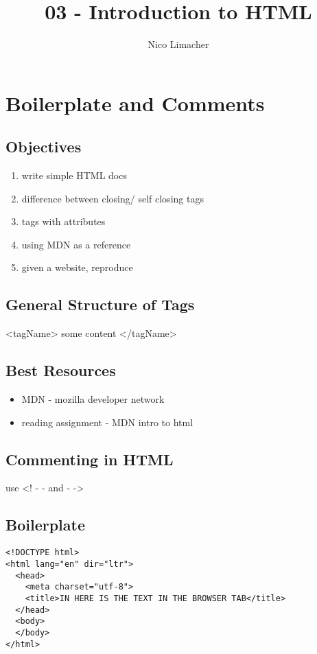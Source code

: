\documentclass{article}
\begin{document}
	
	\title{03 - Introduction to HTML}
	\author{Nico Limacher}
	
\maketitle
\section{Boilerplate and Comments}
\subsection{Objectives}

\begin{enumerate}
	\itemsep0em
	\item write simple HTML docs
	\item difference between closing/ self closing tags
	\item tags with attributes
	\item using MDN as a reference
	\item given a website, reproduce
\end{enumerate}

\subsection{General Structure of Tags}
<tagName> some content </tagName>

\subsection{Best Resources}
\begin{itemize}
	\itemsep0em
	\item MDN - mozilla developer network
	\item reading assignment - MDN intro to html
\end{itemize}

\subsection{Commenting in HTML}
use <! - - and - ->

\subsection{Boilerplate}
\begin{verbatim}
<!DOCTYPE html>
<html lang="en" dir="ltr">
  <head>
    <meta charset="utf-8">
    <title>IN HERE IS THE TEXT IN THE BROWSER TAB</title>
  </head>
  <body>
  </body>
</html>
\end{verbatim}
\end{document}
